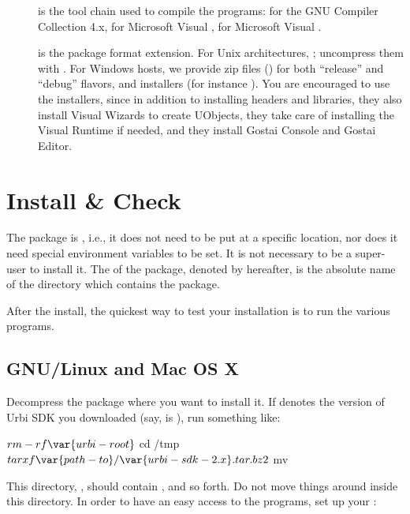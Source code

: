 \begin{description}
\item[] is the tool chain used to compile the programs:
   for the GNU Compiler Collection 4.x,  for
  Microsoft Visual ,  for Microsoft Visual
  .
\item[] is the package format extension.  For Unix architectures,
  ; uncompress them with .  For
  Windows hosts, we provide zip files () for both ``release''
  and ``debug'' flavors, and installers (for instance ).  You
  are encouraged to use the installers, since in addition to installing
  headers and libraries, they also install Visual \Cxx Wizards to create
  UObjects, they take care of installing the Visual Runtime if needed, and
  they install Gostai Console and Gostai Editor.
\end{description}

\section{Install \&{} Check}
\label{sec:install:install}

The package is , i.e., it does not need to be put at
a specific location, nor does it need special environment variables to
be set.  It is not necessary to be a super-user to install it.  The
 of the package, denoted by  hereafter, is
the absolute name of the directory which contains the package.

After the install, the quickest way to test your installation is to run
the various programs.

\subsection{GNU/Linux and Mac OS X}

Decompress the package where you want to install it.  If 
denotes the version of Urbi SDK you downloaded (say,  is
), run something like:

\begin{shell}
$ rm -rf \var{urbi-root}
$ cd /tmp
$ tar xf \var{path-to}/\var{urbi-sdk-2.x}.tar.bz2
$ mv  
\end{shell}

This directory, , should contain , 
and so forth.  Do not move things around inside this directory.  In order to
have an easy access to the \urbi programs, set up your :


